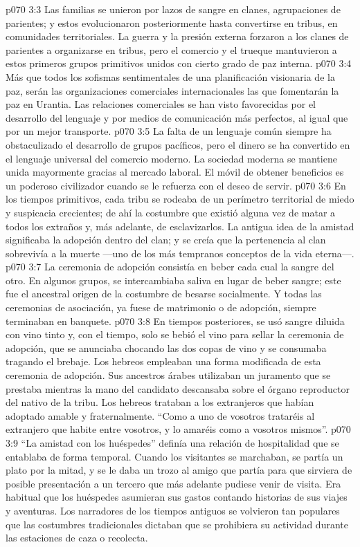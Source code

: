 \vs p070 3:3 \pc Las familias se unieron por lazos de sangre en clanes, agrupaciones de parientes; y estos evolucionaron posteriormente hasta convertirse en tribus, en comunidades territoriales. La guerra y la presión externa forzaron a los clanes de parientes a organizarse en tribus, pero el comercio y el trueque mantuvieron a estos primeros grupos primitivos unidos con cierto grado de paz interna.
\vs p070 3:4 Más que todos los sofismas sentimentales de una planificación visionaria de la paz, serán las organizaciones comerciales internacionales las que fomentarán la paz en Urantia. Las relaciones comerciales se han visto favorecidas por el desarrollo del lenguaje y por medios de comunicación más perfectos, al igual que por un mejor transporte.
\vs p070 3:5 La falta de un lenguaje común siempre ha obstaculizado el desarrollo de grupos pacíficos, pero el dinero se ha convertido en el lenguaje universal del comercio moderno. La sociedad moderna se mantiene unida mayormente gracias al mercado laboral. El móvil de obtener beneficios es un poderoso civilizador cuando se le refuerza con el deseo de servir.
\vs p070 3:6 \pc En los tiempos primitivos, cada tribu se rodeaba de un perímetro territorial de miedo y suspicacia crecientes; de ahí la costumbre que existió alguna vez de matar a todos los extraños y, más adelante, de esclavizarlos. La antigua idea de la amistad significaba la adopción dentro del clan; y se creía que la pertenencia al clan sobrevivía a la muerte ---uno de los más tempranos conceptos de la vida eterna---.
\vs p070 3:7 La ceremonia de adopción consistía en beber cada cual la sangre del otro. En algunos grupos, se intercambiaba saliva en lugar de beber sangre; este fue el ancestral origen de la costumbre de besarse socialmente. Y todas las ceremonias de asociación, ya fuese de matrimonio o de adopción, siempre terminaban en banquete.
\vs p070 3:8 En tiempos posteriores, se usó sangre diluida con vino tinto y, con el tiempo, solo se bebió el vino para sellar la ceremonia de adopción, que se anunciaba chocando las dos copas de vino y se consumaba tragando el brebaje. Los hebreos empleaban una forma modificada de esta ceremonia de adopción. Sus ancestros árabes utilizaban un juramento que se prestaba mientras la mano del candidato descansaba sobre el órgano reproductor del nativo de la tribu. Los hebreos trataban a los extranjeros que habían adoptado amable y fraternalmente. “Como a uno de vosotros trataréis al extranjero que habite entre vosotros, y lo amaréis como a vosotros mismos”.
\vs p070 3:9 “La amistad con los huéspedes” definía una relación de hospitalidad que se entablaba de forma temporal. Cuando los visitantes se marchaban, se partía un plato por la mitad, y se le daba un trozo al amigo que partía para que sirviera de posible presentación a un tercero que más adelante pudiese venir de visita. Era habitual que los huéspedes asumieran sus gastos contando historias de sus viajes y aventuras. Los narradores de los tiempos antiguos se volvieron tan populares que las costumbres tradicionales dictaban que se prohibiera su actividad durante las estaciones de caza o recolecta.
